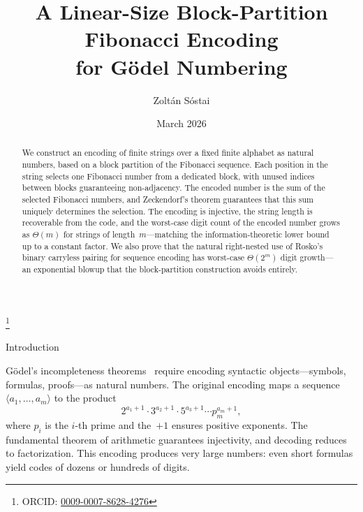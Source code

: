 \documentclass[11pt]{amsart}
\makeatletter
\renewcommand{\section}{\@startsection{section}{1}%
  \z@{.7\linespacing\@plus\linespacing}{.5\linespacing}%
  {\normalfont\bfseries}}
\theoremstyle{plain}
\theoremstyle{definition}
\theoremstyle{remark}
\makeatother
\begin{document}
\title{A Linear-Size Block-Partition Fibonacci Encoding\\for G\"odel Numbering}

\author{Zolt\'an S\'ostai}
\thanks{ORCID: \href{https://orcid.org/0009-0007-8628-4276}{0009-0007-8628-4276}}

\date{March 2026}

\begin{abstract}
We construct an encoding of finite strings over a fixed finite alphabet as natural numbers, based on a block partition of the Fibonacci sequence. Each position in the string selects one Fibonacci number from a dedicated block, with unused indices between blocks guaranteeing non-adjacency. The encoded number is the sum of the selected Fibonacci numbers, and Zeckendorf's theorem \cite{Zeckendorf1972,Lekkerkerker1952} guarantees that this sum uniquely determines the selection. The encoding is injective, the string length is recoverable from the code, and the worst-case digit count of the encoded number grows as $\Theta(m)$ for strings of length~$m$---matching the information-theoretic lower bound up to a constant factor. We also prove that the natural right-nested use of Rosko's~\cite{Rosko2025} binary carryless pairing for sequence encoding has worst-case $\Theta(2^m)$ digit growth---an exponential blowup that the block-partition construction avoids entirely.
\end{abstract}



\maketitle

\section{Introduction}

G\"odel's incompleteness theorems~\cite{Goedel1931} require encoding syntactic objects---symbols, formulas, proofs---as natural numbers. The original encoding maps a sequence $\langle a_1, \ldots, a_m \rangle$ to the product
\[
2^{a_1+1} \cdot 3^{a_2+1} \cdot 5^{a_3+1} \cdots p_m^{a_m+1},
\]
where $p_i$ is the $i$-th prime and the~$+1$ ensures positive exponents. The fundamental theorem of arithmetic guarantees injectivity, and decoding reduces to factorization. This encoding produces very large numbers: even short formulas yield codes of dozens or hundreds of digits.
\end{document}
